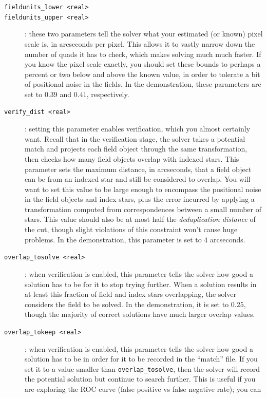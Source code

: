 \documentclass[12pt,letterpaper,titlepage]{article}
\newcommand{\code}[1]{\texttt{#1}}
\begin{document}
\begin{description}
\item[\code{fieldunits\_lower <real>}]
\item[\code{fieldunits\_upper <real>}]: these two parameters tell the solver
  what your estimated (or known) pixel scale is, in arcseconds per pixel.
  This allows it to vastly narrow down the number of quads it has to check,
  which makes solving much much faster.  If you know the pixel scale exactly,
  you should set these bounds to perhaps a percent or two below and above
  the known value, in order to tolerate a bit of positional noise in the fields.
  In the demonstration, these parameters are set to $0.39$ and $0.41$,
  respectively.
\item[\code{verify\_dist <real>}]: setting this parameter enables verification,
  which you almost certainly want.  Recall that in the verification stage, the
  solver takes a potential match and projects each field object through the
  same transformation, then checks how many field objects overlap with
  indexed stars.  This parameter sets the maximum distance, in arcseconds,
  that a field object can be from an indexed star and still be considered
  to overlap.  You will want to set this value to be large enough to
  encompass the positional noise in the field objects and index stars, plus
  the error incurred by applying a transformation computed from correspondences
  between a small number of stars.  This value should also be at most half
  the \emph{deduplication distance} of the cut, though slight violations of
  this constraint won't cause huge problems.  In the demonstration, this
  parameter is set to $4$ arcseconds.
\item[\code{overlap\_tosolve <real>}]: when verification is enabled, this
  parameter tells the solver how good a solution has to be for it to stop
  trying further.  When a solution results in at least this fraction of
  field and index stars overlapping, the solver considers the field to be
  solved.  In the demonstration, it is set to $0.25$, though the majority of
  correct solutions have much larger overlap values.
\item[\code{overlap\_tokeep <real>}]: when verification is enabled, this
  parameter tells the solver how good a solution has to be in order for it
  to be recorded in the ``match'' file.  If you set it to a value smaller
  than \code{overlap\_tosolve}, then the solver will record the potential
  solution but continue to search further.  This is useful if you are
  exploring the ROC curve (false positive vs false negative rate); you can

\end{description}
\end{document}
